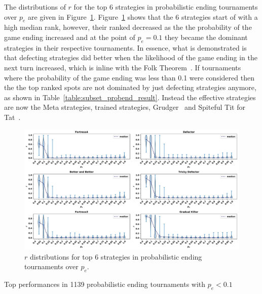 \documentclass{article}
\begin{document}
The distributions of \(r\) for the top 6 strategies in probabilistic ending
tournaments over \(p_e\) are given in Figure~\ref{fig:effect_of_probend}.
Figure~\ref{fig:effect_of_probend} shows that the 6 strategies start of with a
high median rank, however, their ranked decreased as the the probability of the
game ending increased and at the point of \(p_e=0.1\) they became the dominant
strategies in their respective tournaments. In essence, what is demonstrated is
that defecting strategies did better when the likelihood of the game ending in
the next turn increased, which is inline with the Folk
Theorem~\cite{Fudenberg2009}. If tournaments where the probability of the game
ending was less than 0.1 were considered then the the top ranked spots are not
dominated by just defecting strategies anymore, as shown in
Table~\ref{table:subset_probend_result}. Instead the effective strategies are
now the Meta strategies, trained strategies, Grudger~\cite{axelrodproject} and
Spiteful Tit for Tat~\cite{prison}.

\begin{figure}[!htbp]
    \centering
    \includegraphics[width=\textwidth]{../images/folk_theorem.pdf}
    \caption{\(r\) distributions for top 6 strategies in probabilistic ending tournaments
    over $p_e$.}
    \label{fig:effect_of_probend}
\end{figure}

\begin{table}[!htbp]
    \centering
    \resizebox{.30\textwidth}{!}{
    }
    \caption{Top performances in 1139 probabilistic ending tournaments with \(p_e < 0.1\)}
    \label{table:subset_probend_result}
\end{table}
\end{document}
